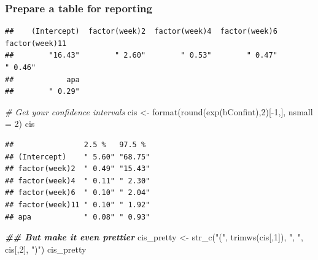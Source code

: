\documentclass[
  openany]{book}
\newenvironment{Shaded}{\begin{snugshade}}{\end{snugshade}}
\newcommand{\AttributeTok}[1]{\textcolor[rgb]{0.77,0.63,0.00}{#1}}
\newcommand{\CommentTok}[1]{\textcolor[rgb]{0.56,0.35,0.01}{\textit{#1}}}
\newcommand{\DecValTok}[1]{\textcolor[rgb]{0.00,0.00,0.81}{#1}}
\newcommand{\DocumentationTok}[1]{\textcolor[rgb]{0.56,0.35,0.01}{\textbf{\textit{#1}}}}
\newcommand{\FunctionTok}[1]{\textcolor[rgb]{0.00,0.00,0.00}{#1}}
\newcommand{\NormalTok}[1]{#1}
\newcommand{\OtherTok}[1]{\textcolor[rgb]{0.56,0.35,0.01}{#1}}
\newcommand{\SpecialCharTok}[1]{\textcolor[rgb]{0.00,0.00,0.00}{#1}}
\newcommand{\StringTok}[1]{\textcolor[rgb]{0.31,0.60,0.02}{#1}}
\begin{document}
\hypertarget{prepare-a-table-for-reporting}{%
\subsubsection{Prepare a table for reporting}\label{prepare-a-table-for-reporting}}

\begin{Shaded}
\end{Shaded}

\begin{verbatim}
##    (Intercept)  factor(week)2  factor(week)4  factor(week)6 factor(week)11 
##        "16.43"        " 2.60"        " 0.53"        " 0.47"        " 0.46" 
##            apa 
##        " 0.29"
\end{verbatim}

\begin{Shaded}
\begin{Highlighting}[]
\CommentTok{\# Get your confidence intervals}
\NormalTok{cis }\OtherTok{\textless{}{-}} \FunctionTok{format}\NormalTok{(}\FunctionTok{round}\NormalTok{(}\FunctionTok{exp}\NormalTok{(bConfint),}\DecValTok{2}\NormalTok{)[}\SpecialCharTok{{-}}\DecValTok{1}\NormalTok{,], }\AttributeTok{nsmall =} \DecValTok{2}\NormalTok{)}
\NormalTok{cis}
\end{Highlighting}
\end{Shaded}

\begin{verbatim}
##                2.5 %   97.5 % 
## (Intercept)    " 5.60" "68.75"
## factor(week)2  " 0.49" "15.43"
## factor(week)4  " 0.11" " 2.30"
## factor(week)6  " 0.10" " 2.04"
## factor(week)11 " 0.10" " 1.92"
## apa            " 0.08" " 0.93"
\end{verbatim}

\begin{Shaded}
\begin{Highlighting}[]
\DocumentationTok{\#\# But make it even prettier}
\NormalTok{cis\_pretty }\OtherTok{\textless{}{-}} \FunctionTok{str\_c}\NormalTok{(}\StringTok{"("}\NormalTok{, }\FunctionTok{trimws}\NormalTok{(cis[,}\DecValTok{1}\NormalTok{]), }\StringTok{", "}\NormalTok{, cis[,}\DecValTok{2}\NormalTok{], }\StringTok{")"}\NormalTok{)}
\NormalTok{cis\_pretty}
\end{Highlighting}
\end{Shaded}
\end{document}
